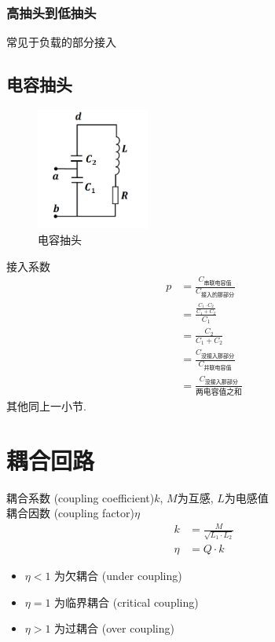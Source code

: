 \documentclass[a4paper]{report}
\begin{document}
\subsubsection{高抽头到低抽头}
常见于负载的部分接入
\subsection{电容抽头}
\begin{figure}[H]
\centering
\includegraphics[width=0.33\textwidth]{tap_c.png}
\caption{电容抽头}
\end{figure}
接入系数
\begin{align*}
  p&=\frac{C_{\text{串联电容值}}}{C_{\text{接入的那部分}}}\\
  &=\frac{\frac{C_1\cdot C_2}{C_1+C_2}}{C_1}\\
  &=\frac{C_2}{C_1+C_2}\\
  &=\frac{C_{\text{没接入那部分}}}{C_{\text{并联电容值}}}\\
  &=\frac{C_{\text{没接入那部分}}}{\text{两电容值之和}}
\end{align*}
其他同上一小节. 
\section{耦合回路}
耦合系数 (coupling coefficient)$k$, $M$为互感, $L$为电感值 \\
耦合因数 (coupling factor)$\eta$
\begin{align*}
  k&=\frac{M}{\sqrt{L_1\cdot L_2}}\\
  \eta&=Q\cdot k
\end{align*}
\begin{itemize}
  \item $\eta<1$ 为欠耦合 (under coupling)
  \item $\eta=1$ 为临界耦合 (critical coupling)
  \item $\eta>1$ 为过耦合 (over coupling) 
\end{itemize}
\end{document}
